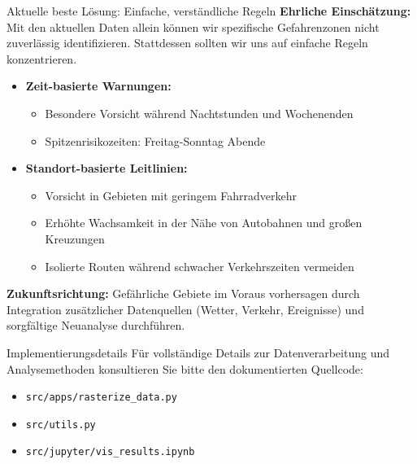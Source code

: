 \documentclass[aspectratio=169,xcolor={usenames,dvipsnames,svgnames,table},10pt,usepdftitle=false,hyperref={bookmarksdepth=3}]{beamer}
\begin{document}
\begin{frame}{Aktuelle beste Lösung: Einfache, verständliche Regeln}
    \vspace{0.3cm}
    \textbf{Ehrliche Einschätzung:} Mit den aktuellen Daten allein können wir spezifische Gefahrenzonen nicht zuverlässig identifizieren. Stattdessen sollten wir uns auf einfache Regeln konzentrieren.\\
    \vspace{0.3cm}
    \begin{itemize}
        \item \textbf{Zeit-basierte Warnungen:}
        \begin{itemize}
            \item Besondere Vorsicht während Nachtstunden und Wochenenden
            \item Spitzenrisikozeiten: Freitag-Sonntag Abende
        \end{itemize}
        
        \item \textbf{Standort-basierte Leitlinien:}
        \begin{itemize}
            \item Vorsicht in Gebieten mit geringem Fahrradverkehr
            \item Erhöhte Wachsamkeit in der Nähe von Autobahnen und großen Kreuzungen
            \item Isolierte Routen während schwacher Verkehrszeiten vermeiden
        \end{itemize}
    \end{itemize}
    
    \vspace{0.4cm}
    \textbf{Zukunftsrichtung:} Gefährliche Gebiete im Voraus vorhersagen durch Integration zusätzlicher Datenquellen (Wetter, Verkehr, Ereignisse) und sorgfältige Neuanalyse durchführen.
\end{frame}


\begin{frame}{Implementierungsdetails}
    Für vollständige Details zur Datenverarbeitung und Analysemethoden konsultieren Sie bitte den dokumentierten Quellcode:
    \begin{itemize}
        \item \texttt{src/apps/rasterize\_data.py}
        \item \texttt{src/utils.py}
        \item \texttt{src/jupyter/vis\_results.ipynb}
    \end{itemize}
\end{frame}
\end{document}
